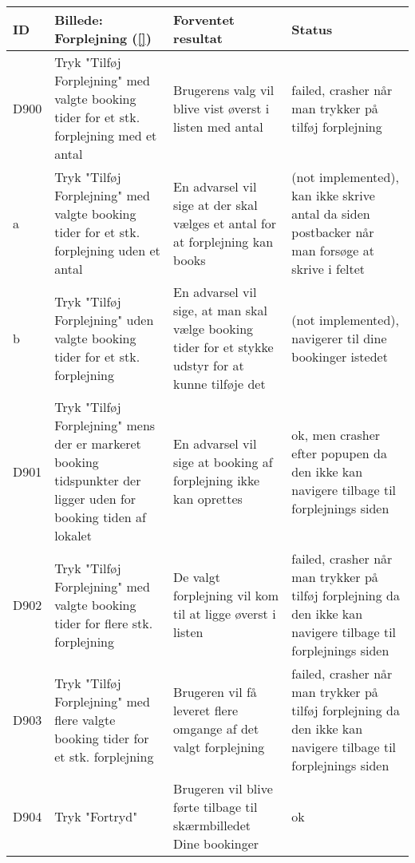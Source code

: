 \begin{tabular}{ |p{1cm}| p{5cm} | p{4cm} | p{1cm} | }
\hline
ID & Billede: Forplejning (\ref{})  & Forventet resultat & Status\\ 
\hline
D900 & Tryk "Tilføj Forplejning" med valgte booking tider for et stk. forplejning med et antal & Brugerens valg vil blive vist øverst i listen med antal & failed, crasher når man trykker på tilføj forplejning \\
\hline
a & Tryk "Tilføj Forplejning" med valgte booking tider for et stk. forplejning uden et antal & En advarsel vil sige at der skal vælges et antal for at forplejning kan books &(not implemented), kan ikke skrive antal da siden postbacker når man forsøge at skrive i feltet \\
\hline
b & Tryk "Tilføj Forplejning" uden valgte booking tider for et stk. forplejning & En advarsel vil sige, at man skal vælge booking tider for et stykke udstyr for at kunne tilføje det &(not implemented), navigerer til dine bookinger istedet \\
\hline
D901 & Tryk "Tilføj Forplejning" mens der er markeret booking tidspunkter der ligger uden for booking tiden af lokalet & En advarsel vil sige at booking af forplejning ikke kan oprettes & ok, men crasher efter popupen da den ikke kan navigere tilbage til forplejnings siden \\
\hline
D902 & Tryk "Tilføj Forplejning" med valgte booking tider for flere stk. forplejning & De valgt forplejning vil kom til at ligge øverst i listen & failed, crasher når man trykker på tilføj forplejning da den ikke kan navigere tilbage til forplejnings siden \\
\hline
D903 & Tryk "Tilføj Forplejning" med flere valgte booking tider for et stk. forplejning & Brugeren vil få leveret flere omgange af det valgt forplejning & failed, crasher når man trykker på tilføj forplejning da den ikke kan navigere tilbage til forplejnings siden\\
\hline
D904 & Tryk "Fortryd" & Brugeren vil blive førte tilbage til skærmbilledet Dine bookinger & ok \\
\hline
\end{tabular}

